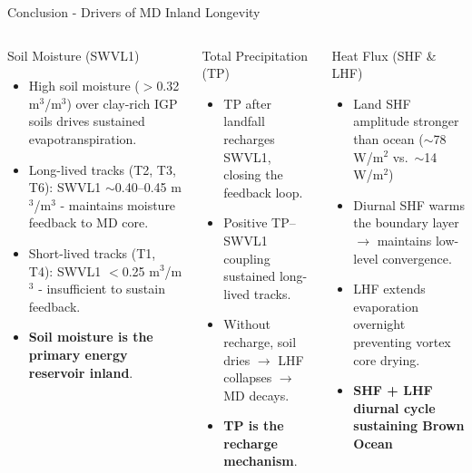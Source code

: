\documentclass[10pt, aspectratio=169,t,xcolor=table]{beamer}
\begin{document}
\begin{frame}{Conclusion - Drivers of MD Inland Longevity}
	\vspace{-0.3cm}
	\begin{columns}[T]

		\begin{block}{\small {} Soil Moisture (SWVL1)}
			\footnotesize
			\begin{itemize}
				\item High soil moisture ($>$0.32 m$^3$/m$^3$) over clay-rich IGP soils drives sustained evapotranspiration.
				\item Long-lived tracks (T2, T3, T6): SWVL1 $\sim$0.40–0.45 m$^3$/m$^3$ - maintains moisture feedback to MD core.
				\item Short-lived tracks (T1, T4): SWVL1 $<$0.25 m$^3$/m$^3$ - insufficient to sustain feedback.
				\item \textbf{Soil moisture is the primary energy reservoir inland}.
			\end{itemize}
		\end{block}

		\vspace{0.2cm}
		\begin{block}{\small {} Total Precipitation (TP)}
			\footnotesize
			\begin{itemize}
				\item TP after landfall recharges SWVL1, closing the feedback loop.
				\item Positive TP–SWVL1 coupling sustained long-lived tracks.
				\item Without recharge, soil dries $\to$ LHF collapses $\to$ MD decays.
				\item \textbf{TP is the recharge mechanism}.
			\end{itemize}
		\end{block}

		\begin{block}{\small {} Heat Flux (SHF \& LHF)}
			\footnotesize
			\begin{itemize}
				\item Land SHF amplitude stronger than ocean ($\sim$78 W/m$^2$ vs.\ $\sim$14 W/m$^2$)
				\item Diurnal SHF warms the boundary layer $\to$ maintains low-level convergence.
				\item LHF extends evaporation overnight preventing vortex core drying.
				\item \textbf{SHF + LHF diurnal cycle sustaining Brown Ocean}
			\end{itemize}
		\end{block}


\end{columns}
\end{frame}
\end{document}
